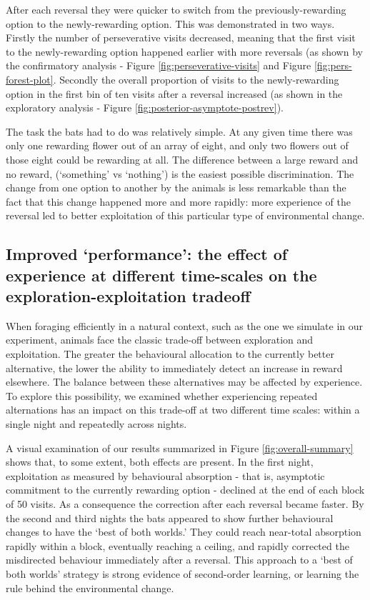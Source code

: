 \documentclass[
]{article}
\begin{document}
After each reversal they were quicker to switch from the previously-rewarding option to the newly-rewarding option. This was demonstrated in two ways. Firstly the number of perseverative visits decreased, meaning that the first visit to the newly-rewarding option happened earlier with more reversals (as shown by the confirmatory analysis - Figure \ref{fig:perseverative-visits} and Figure \ref{fig:pers-forest-plot}. Secondly the overall proportion of visits to the newly-rewarding option in the first bin of ten visits after a reversal increased (as shown in the exploratory analysis - Figure \ref{fig:posterior-asymptote-postrev}).

The task the bats had to do was relatively simple. At any given time there was only one rewarding flower out of an array of eight, and only two flowers out of those eight could be rewarding at all. The difference between a large reward and no reward, (`something' vs `nothing') is the easiest possible discrimination. The change from one option to another by the animals is less remarkable than the fact that this change happened more and more rapidly: more experience of the reversal led to better exploitation of this particular type of environmental change.

\hypertarget{improved-performance-the-effect-of-experience-at-different-time-scales-on-the-exploration-exploitation-tradeoff}{%
\subsection{Improved `performance': the effect of experience at different time-scales on the exploration-exploitation tradeoff}\label{improved-performance-the-effect-of-experience-at-different-time-scales-on-the-exploration-exploitation-tradeoff}}

When foraging efficiently in a natural context, such as the one we simulate in our experiment, animals face the classic trade-off between exploration and exploitation. The greater the behavioural allocation to the currently better alternative, the lower the ability to immediately detect an increase in reward elsewhere. The balance between these alternatives may be affected by experience. To explore this possibility, we examined whether experiencing repeated alternations has an impact on this trade-off at two different time scales: within a single night and repeatedly across nights.

A visual examination of our results summarized in Figure \ref{fig:overall-summary} shows that, to some extent, both effects are present. In the first night, exploitation as measured by behavioural absorption - that is, asymptotic commitment to the currently rewarding option - declined at the end of each block of 50 visits. As a consequence the correction after each reversal became faster. By the second and third nights the bats appeared to show further behavioural changes to have the `best of both worlds.' They could reach near-total absorption rapidly within a block, eventually reaching a ceiling, and rapidly corrected the misdirected behaviour immediately after a reversal. This approach to a `best of both worlds' strategy is strong evidence of second-order learning, or learning the rule behind the environmental change.
\end{document}
